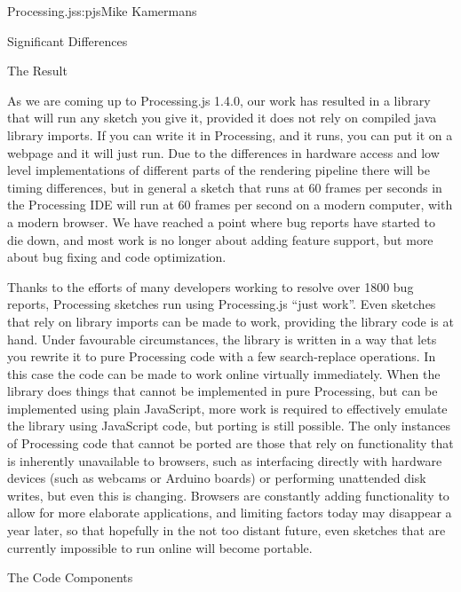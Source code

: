 \begin{aosachapter}{Processing.js}{s:pjs}{Mike Kamermans}
\begin{aosasect1}{Significant Differences}

\begin{aosasect2}{The Result}

As we are coming up to Processing.js 1.4.0, our work has resulted in a
library that will run any sketch you give it, provided it does not
rely on compiled java library imports. If you can write it in
Processing, and it runs, you can put it on a webpage and it will just
run. Due to the differences in hardware access and low level
implementations of different parts of the rendering pipeline there
will be timing differences, but in general a sketch that runs at 60
frames per seconds in the Processing IDE will run at 60 frames per
second on a modern computer, with a modern browser. We have reached a
point where bug reports have started to die down, and most work is no
longer about adding feature support, but more about bug fixing and
code optimization.

Thanks to the efforts of many developers working to resolve over 1800
bug reports, Processing sketches run using Processing.js ``just
work''. Even sketches that rely on library imports can be made to work,
providing the library code is at hand. Under favourable circumstances,
the library is written in a way that lets you rewrite it to pure
Processing code with a few search-replace operations. In this case the
code can be made to work online virtually immediately. When the
library does things that cannot be implemented in pure Processing, but
can be implemented using plain JavaScript, more work is required to
effectively emulate the library using JavaScript code, but porting is
still possible. The only instances of Processing code that cannot be
ported are those that rely on functionality that is inherently
unavailable to browsers, such as interfacing directly with hardware
devices (such as webcams or Arduino boards) or performing unattended
disk writes, but even this is changing. Browsers are constantly adding
functionality to allow for more elaborate applications, and limiting
factors today may disappear a year later, so that hopefully in the not
too distant future, even sketches that are currently impossible to run
online will become portable.

\end{aosasect2}

\end{aosasect1}

\begin{aosasect1}{The Code Components}


\end{aosasect1}
\end{aosachapter}
